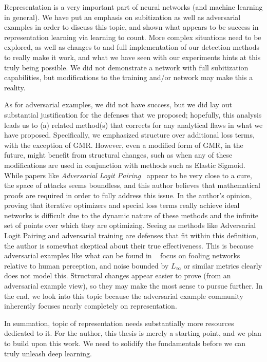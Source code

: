 Representation is a very important part of neural networks (and machine learning in general). We
have put an emphasis on subitization as well as adversarial examples in order to discuss this topic,
and shown what appears to be success in representation learning via learning to count. More complex
situations need to be explored, as well as changes to and full implementation of our detection
methods to really make it work, and what we have seen with our experiments hints at this truly being
possible. We did not demonstrate a network with full subitization capabilities, but modifications to
the training and/or network may make this a reality.


As for adversarial examples, we did not have success, but we did lay out substantial justification
for the defenses that we proposed; hopefully, this analysis leads us to (a) related method(s) that
corrects for any analytical flaws in what we have proposed. Specifically, we emphasized structure
over additional loss terms, with the exception of GMR. However, even a modified form of GMR, in the
future, might benefit from structural changes, such as when any of these modifications are used in
conjunction with methods such as Elastic Sigmoid. While papers like \textit{Adversarial Logit
Pairing}~\cite{kannan2018adversarial} appear to be very close to a cure, the space of attacks seems
boundless, and this author believes that mathematical proofs are required in order to fully address
this issue. In the author's opinion, proving that iterative optimizers and special loss terms really
achieve ideal networks is difficult due to the dynamic nature of these methods and the infinite set
of points over which they are optimizing. Seeing as methods like Adversarial Logit Pairing and
adversarial training are defenses that fit within this definition, the author is somewhat skeptical
about their true effectiveness. This is because adversarial examples like what can be found in
~\cite{eykholt2018robust} focus on fooling networks relative to  human perception, and
noise bounded by $L_{\infty}$ or similar metrics clearly does not model this. Structural changes
appear easier to prove (from an adversarial example view), so they may make the most sense to pursue
further. In the end, we look into this topic because the adversarial example community inherently
focuses nearly completely on representation.

In summation, topic of representation needs substantially more resources dedicated to it. For the
author, this thesis is merely a starting point, and we plan to build upon this work. We need to
solidify the fundamentals before we can truly unleash deep learning.